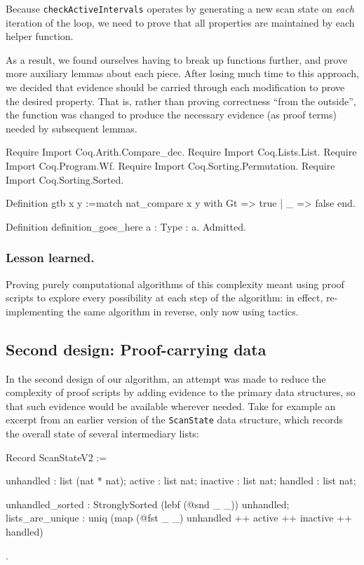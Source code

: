 \documentclass{llncs}
\newenvironment{MyCoqExampleStar}{\small \verbatim}{\endverbatim \normalsize}
\begin{document}
Because \texttt{checkActiveIntervals} operates by generating a new scan state
on \emph{each} iteration of the loop, we need to prove that all properties are
maintained by each helper function.

As a result, we found ourselves having to break up functions further, and
prove more auxiliary lemmas about each piece.  After losing much time to this
approach, we decided that evidence should be carried through each modification
to prove the desired property.  That is, rather than proving correctness
``from the outside'', the function was changed to produce the necessary
evidence (as proof terms) needed by subsequent lemmas.

\begin{MyCoqEval}
Require Import Coq.Arith.Compare_dec.
Require Import Coq.Lists.List.
Require Import Coq.Program.Wf.
Require Import Coq.Sorting.Permutation.
Require Import Coq.Sorting.Sorted.

Definition gtb x y :=match nat_compare x y with Gt => true | _ => false end.

Definition definition_goes_here {a : Type} : a. Admitted.
\end{MyCoqEval}

\subsubsection*{Lesson learned.}

Proving purely computational algorithms of this complexity meant using proof
scripts to explore every possibility at each step of the algorithm: in effect,
re-implementing the same algorithm in reverse, only now using tactics.

\subsection{Second design: Proof-carrying data}
\label{sec:depinduct}

In the second design of our algorithm, an attempt was made to reduce the
complexity of proof scripts by adding evidence to the primary data structures,
so that such evidence would be available wherever needed.  Take for example an
excerpt from an earlier version of the \texttt{ScanState} data structure,
which records the overall state of several intermediary lists:

\begin{MyCoqExampleStar}
Record ScanStateV2 := {
    unhandled : list (nat * nat);
    active    : list nat;
    inactive  : list nat;
    handled   : list nat;

    unhandled_sorted : StronglySorted (lebf (@snd _ _)) unhandled;
    lists_are_unique : uniq (map (@fst _ _) unhandled ++ active ++
                             inactive ++ handled)
}.
\end{MyCoqExampleStar}
\end{document}
